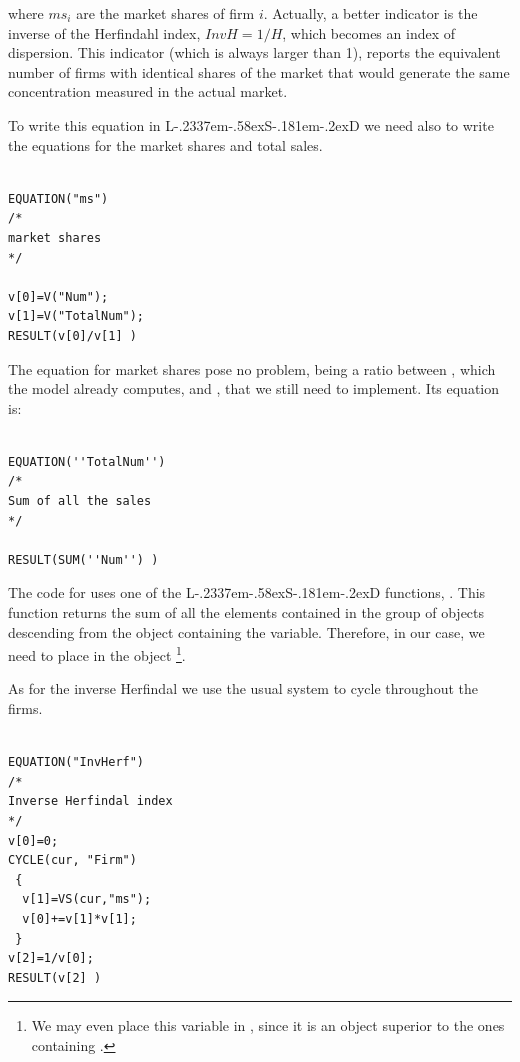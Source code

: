 \documentclass [11pt,a4paper] {book}
\def\LsD{{L\kern-.2337em\lower-.58ex\hbox{S}\kern-.181em\lower-.2ex\hbox{D}}\xspace}
\begin{document}
where $ms_i$ are the market shares of firm $i$. Actually, a better indicator is the inverse of the Herfindahl index, $InvH=1/H$, which becomes an index of dispersion. This indicator (which is always larger than 1), reports the equivalent number of firms with identical shares of the market that would generate the same concentration measured in the actual market.

To write this equation in \LsD we need also to write the equations for the market shares and total sales.


\begin{minipage}[h]{10cm}
\small
\begin{verbatim}

EQUATION("ms")
/*
market shares
*/

v[0]=V("Num");
v[1]=V("TotalNum");
RESULT(v[0]/v[1] )

\end{verbatim}
\normalsize
\end{minipage}

The equation for market shares pose no problem, being a ratio between , which the model already computes, and , that we still need to implement. Its equation is:

\begin{minipage}[h]{10cm}
\small
\begin{verbatim}

EQUATION(''TotalNum'')
/*
Sum of all the sales
*/

RESULT(SUM(''Num'') )

\end{verbatim}
\normalsize
\end{minipage}

The code for  uses one of the \LsD functions, . This function returns the sum of all the elements  contained in the group of objects descending from the object containing the variable. Therefore, in our case, we need to place  in the object \footnote{We may even place this variable in , since it is an object superior to the ones containing .}.


As for the inverse Herfindal we use the usual system to cycle throughout the firms.
\begin{minipage}[h]{10cm}
\small
\begin{verbatim}

EQUATION("InvHerf")
/*
Inverse Herfindal index
*/
v[0]=0;
CYCLE(cur, "Firm")
 {
  v[1]=VS(cur,"ms");
  v[0]+=v[1]*v[1];
 }
v[2]=1/v[0];
RESULT(v[2] )

\end{verbatim}
\normalsize
\end{minipage}
\end{document}
